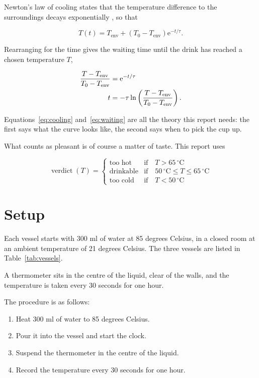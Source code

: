 \documentclass[a4paper,11pt]{article}
\begin{document}
Newton's law of cooling states that the temperature difference to the surroundings decays
exponentially \cite{halliday2018}, so that

\begin{equation}
    T(t) = T_\mathrm{env} + \left( T_0 - T_\mathrm{env} \right) \mathrm{e}^{-t/\tau} .
    \label{eq:cooling}
\end{equation}

Rearranging for the time gives the waiting time until the drink has reached a chosen
temperature $T$,

\begin{align}
    \frac{T - T_\mathrm{env}}{T_0 - T_\mathrm{env}}
        &= \mathrm{e}^{-t/\tau} \notag \\
    t &= -\tau \ln \left( \frac{T - T_\mathrm{env}}{T_0 - T_\mathrm{env}} \right) .
    \label{eq:waiting}
\end{align}

Equations~\eqref{eq:cooling} and~\eqref{eq:waiting} are all the theory this report needs:
the first says what the curve looks like, the second says when to pick the cup up.

What counts as pleasant is of course a matter of taste.
This report uses

\[
    \operatorname{verdict}(T) =
    \begin{cases}
        \text{too hot}   & \text{if} \quad T > 65\,^{\circ}\mathrm{C} \\
        \text{drinkable} & \text{if} \quad 50\,^{\circ}\mathrm{C} \leq T \leq 65\,^{\circ}\mathrm{C} \\
        \text{too cold}  & \text{if} \quad T < 50\,^{\circ}\mathrm{C}
    \end{cases}
\]

\section{Setup}\label{sec:setup}

Each vessel starts with 300 ml of water at 85 degrees Celsius,
in a closed room at an ambient temperature of 21 degrees Celsius.
The three vessels are listed in Table~\ref{tab:vessels}.

A thermometer sits in the centre of the liquid, clear of the walls,
and the temperature is taken every 30 seconds for one hour.

The procedure is as follows:

\begin{enumerate}
    \item Heat 300 ml of water to 85 degrees Celsius.
    \item Pour it into the vessel and start the clock.
    \item Suspend the thermometer in the centre of the liquid.
    \item Record the temperature every 30 seconds for one hour.
\end{enumerate}
\end{document}
